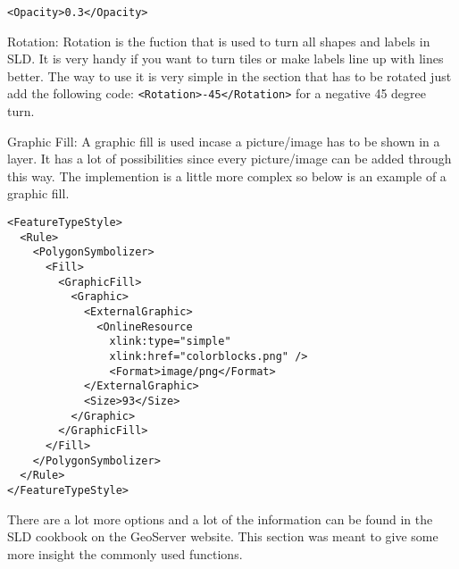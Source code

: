 \lstinline|<Opacity>0.3</Opacity>|

Rotation: Rotation is the fuction that is used to turn all shapes and labels in SLD. It is very handy if you want to turn tiles or make labels line up with lines better. The way to use it is very simple in the section that has to be rotated just add the following code: \lstinline|<Rotation>-45</Rotation>| for a negative 45 degree turn.

Graphic Fill: A graphic fill is used incase a picture/image has to be shown in a layer. It has a lot of possibilities since every picture/image can be added through this way. The implemention is a little more complex so below is an example of a graphic fill. 
\begin{lstlisting}
<FeatureTypeStyle>
  <Rule>
    <PolygonSymbolizer>
      <Fill>
        <GraphicFill>
          <Graphic>
	        <ExternalGraphic>
			  <OnlineResource
				xlink:type="simple"
				xlink:href="colorblocks.png" />
				<Format>image/png</Format>
			</ExternalGraphic>
		    <Size>93</Size>
		  </Graphic>
		</GraphicFill>
	  </Fill>
	</PolygonSymbolizer>
  </Rule>
</FeatureTypeStyle>
\end{lstlisting}

There are a lot more options and a lot of the information can be found in the SLD cookbook on the GeoServer website. This section was meant to give some more insight the commonly used functions.
  
